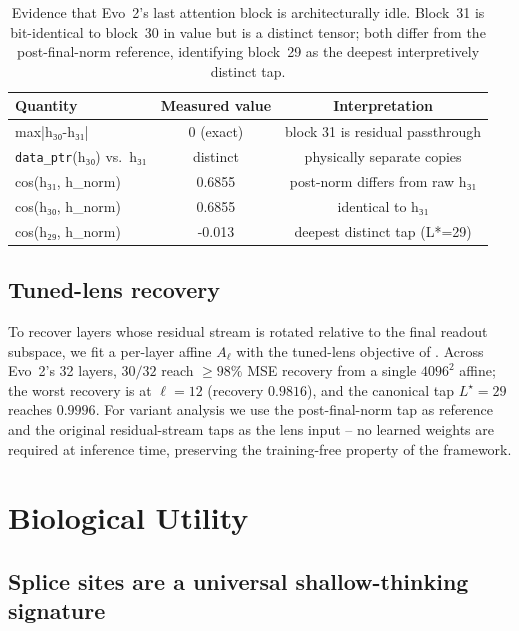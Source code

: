 \documentclass[12pt]{article}
\theoremstyle{plain}
\theoremstyle{definition}
\theoremstyle{remark}
\begin{document}
\begin{table}[t]
\caption{Evidence that Evo~2's last attention block is architecturally
idle. Block~31 is bit-identical to block~30 in value but is a distinct
tensor; both differ from the post-final-norm reference, identifying
block~29 as the deepest interpretively distinct tap.}
\label{tab:idle-block}
\centering
\small
\begin{tabular}{@{}lcc@{}}
\toprule
Quantity & Measured value & Interpretation \\
\midrule
max|h₃₀-h₃₁| & 0 (exact) &
   block 31 is residual passthrough \\
\texttt{data\_ptr}(h₃₀) vs.\ h₃₁ & distinct &
   physically separate copies \\
cos(h₃₁, h\_norm) & 0.6855 &
   post-norm differs from raw h₃₁ \\
cos(h₃₀, h\_norm) & 0.6855 &
   identical to h₃₁ \\
cos(h₂₉, h\_norm) & -0.013 &
   deepest distinct tap (L*=29) \\
\bottomrule
\end{tabular}
\end{table}

\subsection{Tuned-lens recovery}
\label{sec:tuned-lens}

To recover layers whose residual stream is rotated relative to the
final readout subspace, we fit a per-layer affine $A_{\ell}$ with the
tuned-lens objective of \citet{belrose2023tunedlens}. Across Evo~2's
32 layers, $30/32$ reach $\ge 98\%$ MSE recovery from a single
$4096^{2}$ affine; the worst recovery is at $\ell=12$ (recovery
$0.9816$), and the canonical tap $L^{\star}=29$ reaches $0.9996$. For
variant analysis we use the post-final-norm tap as reference and the
original residual-stream taps as the lens input -- no learned weights
are required at inference time, preserving the training-free property
of the framework.

\section{Biological Utility}
\label{sec:utility}

\subsection{Splice sites are a universal shallow-thinking signature}
\label{sec:splice}
\end{document}
